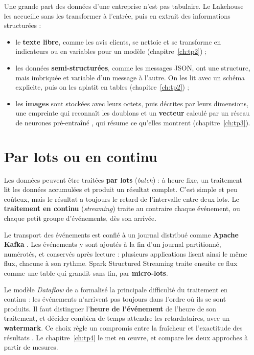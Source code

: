 Une grande part des données d'une entreprise n'est pas tabulaire. Le Lakehouse les accueille sans
les transformer à l'entrée, puis en extrait des informations structurées :
\begin{itemize}[leftmargin=*,itemsep=2pt]
  \item le \textbf{texte libre}, comme les avis clients, se nettoie et se transforme en indicateurs
        ou en variables pour un modèle (chapitre~\ref{ch:tp2}) ;
  \item les données \textbf{semi-structurées}, comme les messages JSON, ont une structure, mais
        imbriquée et variable d'un message à l'autre. On les lit avec un schéma explicite, puis on
        les aplatit en tables (chapitre~\ref{ch:tp2}) ;
  \item les \textbf{images} sont stockées avec leurs octets, puis décrites par leurs dimensions, une
        empreinte qui reconnaît les doublons et un \textbf{vecteur} calculé par un réseau de
        neurones pré-entraîné \citep{howard2019}, qui résume ce qu'elles montrent
        (chapitre~\ref{ch:tp3}).
\end{itemize}

\section{Par lots ou en continu}\label{sec:c1-streaming}

Les données peuvent être traitées \textbf{par lots} (\emph{batch}) :
à heure fixe, un traitement lit les données accumulées et produit un résultat complet. C'est simple
et peu coûteux, mais le résultat a toujours le retard de l'intervalle entre deux lots. Le
\textbf{traitement en continu} (\emph{streaming}) traite au contraire chaque
événement, ou chaque petit groupe d'événements, dès son arrivée.

Le transport des événements est confié à un journal distribué comme \textbf{Apache
Kafka} \citep{kreps2011}. Les événements y sont ajoutés à la fin d'un journal
partitionné, numérotés, et conservés après lecture : plusieurs applications lisent ainsi le même
flux, chacune à son rythme. Spark Structured Streaming \citep{armbrust2018} traite ensuite ce flux
comme une table qui grandit sans fin, par \textbf{micro-lots}.

Le modèle \emph{Dataflow} de \citet{akidau2015} a formalisé la principale difficulté du traitement
en continu : les événements n'arrivent pas toujours dans l'ordre où ils se sont produits. Il faut
distinguer l'\textbf{heure de l'événement} de l'heure de son
traitement, et décider combien de temps attendre les retardataires, avec un
\textbf{watermark}. Ce choix règle un compromis entre la fraîcheur et l'exactitude
des résultats \citep{akidau2018}. Le chapitre~\ref{ch:tp4} le met en œuvre, et compare les deux
approches à partir de mesures.


